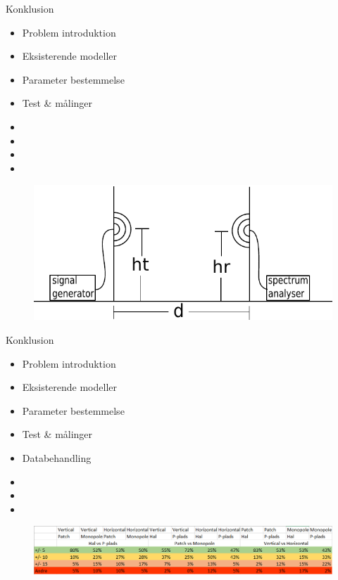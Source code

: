 \begin{frame}{Konklusion}
	\begin{minipage}{0.5\textwidth}
		\begin{itemize}
		\item Problem introduktion
		\item Eksisterende modeller
		\item Parameter bestemmelse
		\item Test \& målinger
		\item[] 
		\item[] 
		\item[] 
		\item[] 
		\end{itemize}
	\end{minipage}%
	\begin{minipage}{0.5\textwidth}
		\begin{figure}[H]
			\centering
			\includegraphics[width=\columnwidth]{figures/setup.pdf}
		\end{figure}
	\end{minipage}%
\end{frame}

\begin{frame}{Konklusion}
	\begin{minipage}{0.5\textwidth}
		\begin{itemize}
		\item Problem introduktion
		\item Eksisterende modeller
		\item Parameter bestemmelse
		\item Test \& målinger
		\item Databehandling
		\item[] 
		\item[] 
		\item[] 
		\end{itemize}
	\end{minipage}%
	\begin{minipage}{0.5\textwidth}
		\begin{figure}[H]
			\centering
			\includegraphics[width=\columnwidth]{figures/Data.png}
		\end{figure}
	\end{minipage}%
\end{frame}

